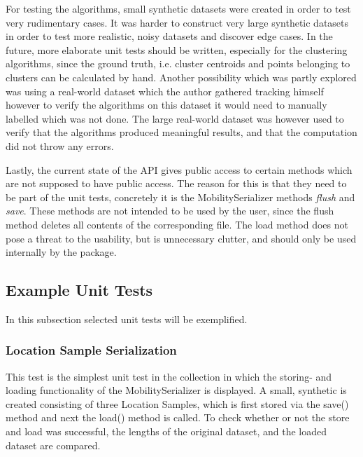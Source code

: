For testing the algorithms, small synthetic datasets were created in order to test very rudimentary cases. It was harder to construct very large synthetic datasets in order to test more realistic, noisy datasets and discover edge cases. In the future, more elaborate unit tests should be written, especially for the clustering algorithms, since the ground truth, i.e. cluster centroids and points belonging to clusters can be calculated by hand. Another possibility which was partly explored was using a real-world dataset which the author gathered tracking himself however to verify the algorithms on this dataset it would need to manually labelled which was not done. The large real-world dataset was however used to verify that the algorithms produced meaningful results, and that the computation did not throw any errors.

Lastly, the current state of the API gives public access to certain methods which are not supposed to have public access. The reason for this is that they need to be part of the unit tests, concretely it is the MobilitySerializer methods \textit{flush} and \textit{save}. These methods are not intended to be used by the user, since the flush method deletes all contents of the corresponding file. The load method does not pose a threat to the usability, but is unnecessary clutter, and should only be used internally by the package. 

\subsection{Example Unit Tests}
In this subsection selected unit tests will be exemplified.

\subsubsection*{Location Sample Serialization}
This test is the simplest unit test in the collection in which the storing- and loading functionality of the MobilitySerializer is displayed. A small, synthetic is created consisting of three Location Samples, which is first stored via the save() method and next the load() method is called. To check whether or not the store and load was successful, the lengths of the original dataset, and the loaded dataset are compared. 

